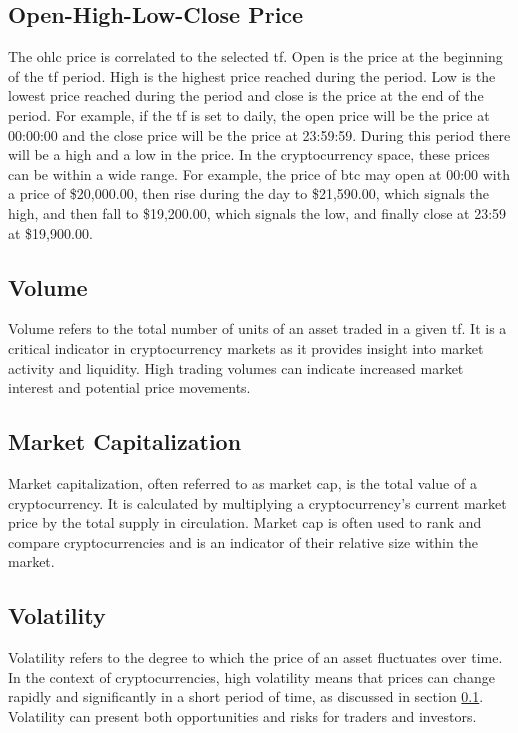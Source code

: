 \subsection{Open-High-Low-Close Price}
\label{sub:OHLC}
The \gls{ohlc} price is correlated to the selected \gls{tf}. Open is the price at the beginning of the \gls{tf} period. High is the highest price reached during the period. Low is the lowest price reached during the period and close is the price at the end of the period.
\newline
\newline
For example, if the \gls{tf} is set to daily, the open price will be the price at 00:00:00 and the close price will be the price at 23:59:59. During this period there will be a high and a low in the price. In the cryptocurrency space, these prices can be within a wide range. For example, the price of \gls{btc} may open at 00:00 with a price of \$20,000.00, then rise during the day to \$21,590.00, which signals the high, and then fall to \$19,200.00, which signals the low, and finally close at 23:59 at \$19,900.00.

\subsection{Volume}
\label{sub:volume}
Volume refers to the total number of units of an asset traded in a given \gls{tf}. It is a critical indicator in cryptocurrency markets as it provides insight into market activity and liquidity. High trading volumes can indicate increased market interest and potential price movements.

\subsection{Market Capitalization}
\label{sub:MarketCap}
Market capitalization, often referred to as market cap, is the total value of a cryptocurrency. It is calculated by multiplying a cryptocurrency's current market price by the total supply in circulation. Market cap is often used to rank and compare cryptocurrencies and is an indicator of their relative size within the market.

\subsection{Volatility}
\label{sub:Vola}
Volatility refers to the degree to which the price of an asset fluctuates over time. In the context of cryptocurrencies, high volatility means that prices can change rapidly and significantly in a short period of time, as discussed in section \ref{sub:OHLC}. Volatility can present both opportunities and risks for traders and investors.

